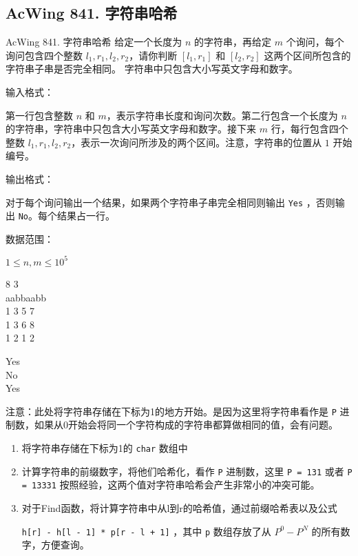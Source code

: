 \subsection{AcWing 841. 字符串哈希}

\begin{titledbox}{AcWing 841. 字符串哈希}
给定一个长度为 $n$ 的字符串，再给定 $m$ 个询问，每个询问包含四个整数 $l_1, r_1, l_2, r_2$，请你判断 $[l_1, r_1]$ 和 $[l_2, r_2]$ 这两个区间所包含的字符串子串是否完全相同。
字符串中只包含大小写英文字母和数字。

输入格式：

第一行包含整数 $n$ 和 $m$，表示字符串长度和询问次数。第二行包含一个长度为 $n$ 的字符串，字符串中只包含大小写英文字母和数字。接下来 $m$ 行，每行包含四个整数 $l_1, r_1, l_2, r_2$，表示一次询问所涉及的两个区间。注意，字符串的位置从 $1$ 开始编号。

输出格式：

对于每个询问输出一个结果，如果两个字符串子串完全相同则输出 \lstinline{Yes} ，否则输出 \lstinline{No}。每个结果占一行。

数据范围：

$1 \le n, m \le 10^5$

\begin{inputblock}
    8 3 \\
    aabbaabb \\
    1 3 5 7 \\
    1 3 6 8 \\
    1 2 1 2
\end{inputblock}
\begin{outputblock}
    Yes \\
    No \\
    Yes
\end{outputblock}
\end{titledbox}

注意：此处将字符串存储在下标为1的地方开始。是因为这里将字符串看作是 \lstinline{P} 进制数，如果从0开始会将同一个字符构成的字符串都算做相同的值，会有问题。

\begin{enumerate}
    \item 将字符串存储在下标为1的 \lstinline{char} 数组中
    \item 计算字符串的前缀数字，将他们哈希化，看作 \lstinline{P} 进制数，这里 \lstinline{P = 131} 或者 \lstinline{P = 13331} 按照经验，这两个值对字符串哈希会产生非常小的冲突可能。
    \item 对于Find函数，将计算字符串中从l到r的哈希值，通过前缀哈希表以及公式
    
    \lstinline{h[r] - h[l - 1] * p[r - l + 1]} ，其中 \lstinline{p} 数组存放了从 $P^0 - P^N$ 的所有数字，方便查询。
\end{enumerate}